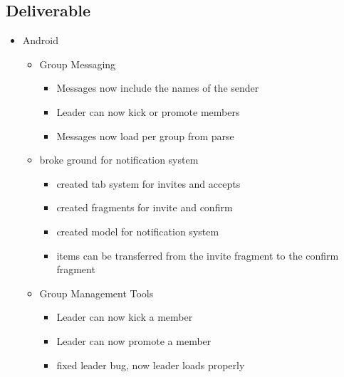 \subsection{Deliverable}
\begin{itemize}
	\item Android
	\begin{itemize}
		\item Group Messaging
		\begin{itemize}
			\item Messages now include the names of the sender
			\item Leader can now kick or promote members
			\item Messages now load per group from parse
		\end{itemize}
		\item broke ground for notification system
		\begin{itemize}
			\item created tab system for invites and accepts
			\item created fragments for invite and confirm
			\item created model for notification system
			\item items can be transferred from the invite fragment to the confirm fragment
		\end{itemize}
		\item Group Management Tools
		\begin{itemize}
			\item Leader can now kick a member
			\item Leader can now promote a member
			\item fixed leader bug, now leader loads properly
		\end{itemize}
	\end{itemize}
\end{itemize}
